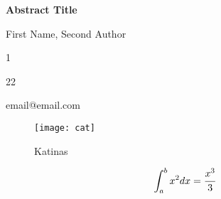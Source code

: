 \documentclass[12pt, twoside, a4paper, hidelinks]{article}
\begin{document}
    \begin{center} {\large \textbf{Abstract Title}} \end{center}
    \begin{center} First Name, Second Author \end{center}

    \begin{center} 1
        
        22
        
        email@email.com
    \end{center}

    \lipsum[2]
\begin{figure}[H]
\center
\texttt{[image: cat]}
\caption{Katinas}
\end{figure}
\lipsum[2]
\begin{equation}
\int_a^b x^2 dx = \cfrac{x^3}{3}
\end{equation}
\lipsum[2]

    \setcounter{footnote}{1} 
        \setcounter{footnote}{2} 
        
    
\end{document}
